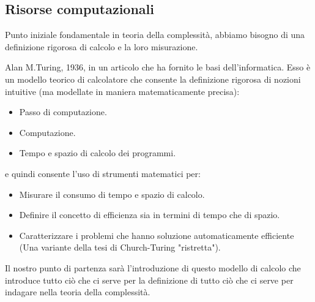 \documentclass{article}
\begin{document}
\subsection{Risorse computazionali}
Punto iniziale fondamentale in teoria della complessità, abbiamo bisogno
di una definizione rigorosa di calcolo e la loro misurazione.

Alan M.Turing, 1936, in un articolo che ha fornito le basi dell'informatica.
Esso è un modello teorico di calcolatore che consente la definizione
rigorosa di nozioni intuitive (ma modellate in maniera matematicamente
precisa):
\begin{itemize}
    \item Passo di computazione.
    \item Computazione.
    \item Tempo e spazio di calcolo dei programmi.
\end{itemize}
e quindi consente l'uso di strumenti matematici per:
\begin{itemize}
    \item Misurare il consumo di tempo e spazio di calcolo.
    \item Definire il concetto di efficienza sia in termini di tempo
    che di spazio.
    \item Caratterizzare i problemi che hanno soluzione automaticamente
    efficiente (Una variante della tesi di Church-Turing "ristretta").
\end{itemize}
Il nostro punto di partenza sarà l'introduzione di questo modello di calcolo
che introduce tutto ciò che ci serve per la definizione di tutto ciò che
ci serve per indagare nella teoria della complessità.
\end{document}
